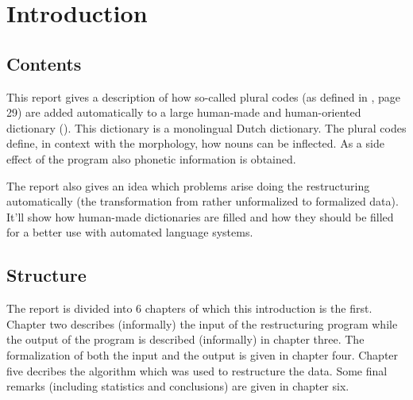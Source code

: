 
   \RosDate{\today}
   \RosSupersedes{-}
   \MakeRosTitle

\newcommand{\kw}[1]{{\bf #1}\ }
\newlength{\Indentation}
\newlength{\Indentsize}
\setlength{\Indentsize}{1.3em}
\newcommand{\Tab}[1]
   {\addtolength{\Indentation}{#1\Indentsize}\\ \hspace*{\Indentation}}
\newcommand{\Tabs}[1]
   {\setlength{\Indentation}{#1\Indentsize}\hspace*{\Indentation}}
\setlength{\parskip}{2mm}
\setlength{\parindent}{0mm}

\section{Introduction}

\subsection{Contents}

This report gives a description of how so-called plural codes (as defined in
\cite{HS:morph}, page 29) are added automatically to a large human-made and 
human-oriented dictionary (\cite{VD:NN}). This dictionary is a monolingual Dutch
dictionary. The plural codes define, in context with the morphology, how nouns 
can be inflected. As a side effect of the program also phonetic information is 
obtained. 

The report also gives an idea which problems arise doing the restructuring 
automatically (the transformation from rather unformalized to formalized data).
It'll show how human-made dictionaries are filled and how they should be filled
for a better use with automated language systems.

\subsection{Structure}

The report is divided into 6 chapters of which this introduction is the first.
Chapter two describes (informally) the input of the restructuring program while
the output of the program is described (informally) in chapter three. The 
formalization of both the input and the output is given in chapter four. 
Chapter five decribes the algorithm which was used to restructure the data.
Some final remarks (including statistics and conclusions) are given in chapter 
six.

